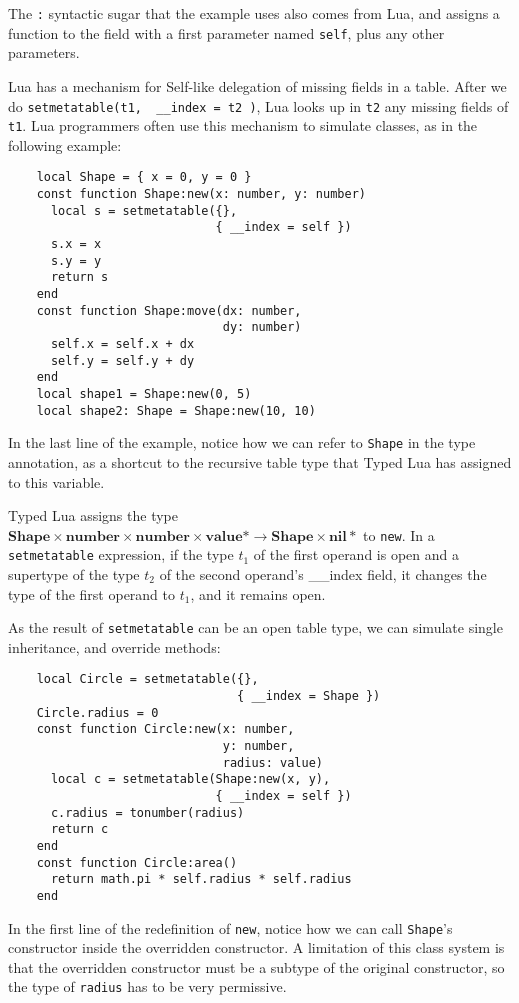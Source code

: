 \documentclass[preprint]{sig-alternate}
\newcommand{\Top}{\mathbf{value}}
\newcommand{\Nil}{\mathbf{nil}}
\newcommand{\Number}{\mathbf{number}}
\begin{document}
The {\tt :} syntactic sugar that the example uses also comes
from Lua, and assigns a function to the field with a first
parameter named {\tt self}, plus any other parameters.

Lua has a mechanism for Self-like delegation of missing
fields in a table. After we do {\tt setmetatable(t1,
{ \_\_index = t2 })}, Lua looks up in {\tt t2} any missing
fields of {\tt t1}. Lua programmers often use this mechanism
to simulate classes, as in the following example:

\begin{verbatim}
    local Shape = { x = 0, y = 0 }
    const function Shape:new(x: number, y: number)
      local s = setmetatable({},
                             { __index = self })
      s.x = x
      s.y = y
      return s
    end
    const function Shape:move(dx: number,
                              dy: number)
      self.x = self.x + dx
      self.y = self.y + dy
    end
    local shape1 = Shape:new(0, 5)
    local shape2: Shape = Shape:new(10, 10)
\end{verbatim} 

In the last line of the example, notice how we can refer
to {\tt Shape} in the type annotation, as a shortcut
to the recursive table type that Typed Lua has assigned
to this variable.

Typed Lua assigns the type
$\mathbf{Shape} \times \Number \times \Number \times
\Top* \rightarrow \mathbf{Shape} \times \Nil*$ to
{\tt new}. In a {\tt setmetatable} expression,
if the type $t_1$ of the first operand is open and a supertype
of the type $t_2$ of the second operand's {\_\_index} field,
it changes the type of the first operand to $t_1$, and
it remains open.

As the result of {\tt setmetatable} can be an open
table type, we can simulate single inheritance, and
override methods:

\begin{verbatim}
    local Circle = setmetatable({},
                                { __index = Shape })
    Circle.radius = 0
    const function Circle:new(x: number,
                              y: number,
                              radius: value)
      local c = setmetatable(Shape:new(x, y),
                             { __index = self })
      c.radius = tonumber(radius)
      return c
    end
    const function Circle:area()
      return math.pi * self.radius * self.radius
    end
\end{verbatim} 

In the first line of the redefinition of {\tt new},
notice how we can call {\tt Shape}'s constructor inside
the overridden constructor. A limitation of this class
system is that the overridden constructor must be a
subtype of the original constructor, so the type of
{\tt radius} has to be very permissive.
\end{document}
